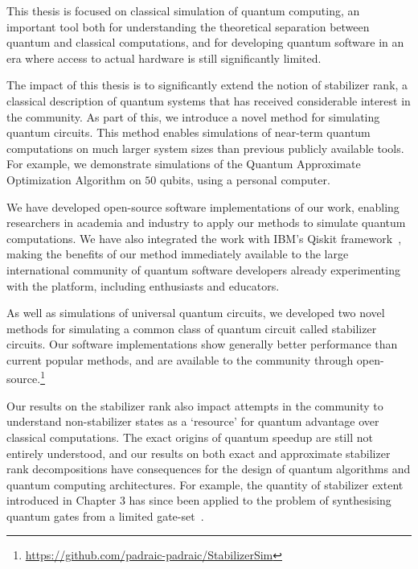 \begin{impactstatement}
This thesis is focused on classical simulation of quantum computing, an important tool both for understanding the theoretical separation between quantum and classical computations, and for developing quantum software in an era where access to actual hardware is still significantly limited.\par
The impact of this thesis is to significantly extend the notion of stabilizer rank, a classical description of quantum systems that has received considerable interest in the community. As part of this, we introduce a novel method for simulating quantum circuits. This method enables simulations of near-term quantum computations on much larger system sizes than previous publicly available tools. For example, we demonstrate simulations of the Quantum Approximate Optimization Algorithm on $50$ qubits, using a personal computer.\par
We have developed open-source software implementations of our work, enabling researchers in academia and industry to apply our methods to simulate quantum computations. We have also integrated the work with IBM's Qiskit framework~\cite{Qiskit}, making the benefits of our method immediately available to the large international community of quantum software developers already experimenting with the platform, including enthusiasts and educators.\par
As well as simulations of universal quantum circuits, we developed two novel methods for simulating a common class of quantum circuit called stabilizer circuits. Our software implementations show generally better performance than current popular methods, and are available to the community through open-source.\footnote{\url{https://github.com/padraic-padraic/StabilizerSim}}\par
Our results on the stabilizer rank also impact attempts in the community to understand non-stabilizer states as a `resource' for quantum advantage over classical computations. The exact origins of quantum speedup are still not entirely understood, and our results on both exact and approximate stabilizer rank decompositions have consequences for the design of quantum algorithms and quantum computing architectures. For example, the quantity of stabilizer extent introduced in Chapter 3 has since been applied to the problem of synthesising quantum gates from a limited gate-set~\cite{Beverland2019}.
\end{impactstatement}

